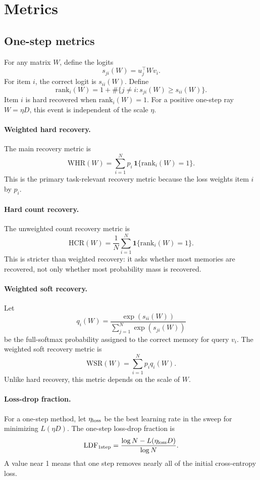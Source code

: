 \documentclass[11pt]{article}
\newcommand{\one}{\mathrm{1step}}
\begin{document}
\section{Metrics}

\subsection{One-step metrics}

For any matrix $W$, define the logits
\[
  s_{ji}(W)=u_j^\top Wv_i .
\]
For item $i$, the correct logit is $s_{ii}(W)$.  Define
\[
  \mathrm{rank}_i(W)
  =
  1+\#\{j\ne i:s_{ji}(W)\ge s_{ii}(W)\}.
\]
Item $i$ is hard recovered when $\mathrm{rank}_i(W)=1$.  For a positive
one-step ray $W=\eta D$, this event is independent of the scale $\eta$.

\paragraph{Weighted hard recovery.}
The main recovery metric is
\[
  \mathrm{WHR}(W)
  =
  \sum_{i=1}^N p_i\,\mathbf{1}\{\mathrm{rank}_i(W)=1\}.
\]
This is the primary task-relevant recovery metric because the loss weights
item $i$ by $p_i$.

\paragraph{Hard count recovery.}
The unweighted count recovery metric is
\[
  \mathrm{HCR}(W)
  =
  \frac1N\sum_{i=1}^N \mathbf{1}\{\mathrm{rank}_i(W)=1\}.
\]
This is stricter than weighted recovery: it asks whether most memories are
recovered, not only whether most probability mass is recovered.

\paragraph{Weighted soft recovery.}
Let
\[
  q_i(W)=
  \frac{\exp(s_{ii}(W))}
  {\sum_{j=1}^N\exp(s_{ji}(W))}
\]
be the full-softmax probability assigned to the correct memory for query
$v_i$.  The weighted soft recovery metric is
\[
  \mathrm{WSR}(W)=\sum_{i=1}^N p_i q_i(W).
\]
Unlike hard recovery, this metric depends on the scale of $W$.

\paragraph{Loss-drop fraction.}
For a one-step method, let $\eta_{\rm loss}$ be the best learning rate in
the sweep for minimizing $L(\eta D)$.  The one-step loss-drop fraction is
\[
  \mathrm{LDF}_{\one}
  =
  \frac{\log N-L(\eta_{\rm loss}D)}{\log N}.
\]
A value near 1 means that one step removes nearly all of the initial
cross-entropy loss.
\end{document}
